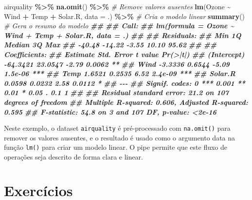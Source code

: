 \documentclass[
]{book}
\newenvironment{Shaded}{\begin{snugshade}}{\end{snugshade}}
\newcommand{\AttributeTok}[1]{\textcolor[rgb]{0.13,0.29,0.53}{#1}}
\newcommand{\CommentTok}[1]{\textcolor[rgb]{0.56,0.35,0.01}{\textit{#1}}}
\newcommand{\DocumentationTok}[1]{\textcolor[rgb]{0.56,0.35,0.01}{\textbf{\textit{#1}}}}
\newcommand{\FunctionTok}[1]{\textcolor[rgb]{0.13,0.29,0.53}{\textbf{#1}}}
\newcommand{\NormalTok}[1]{#1}
\newcommand{\SpecialCharTok}[1]{\textcolor[rgb]{0.81,0.36,0.00}{\textbf{#1}}}
\begin{document}
\begin{Shaded}
\begin{Highlighting}[]
\NormalTok{airquality }\SpecialCharTok{\%\textgreater{}\%}
  \FunctionTok{na.omit}\NormalTok{() }\SpecialCharTok{\%\textgreater{}\%} \CommentTok{\# Remove valores ausentes}
  \FunctionTok{lm}\NormalTok{(Ozone }\SpecialCharTok{\textasciitilde{}}\NormalTok{ Wind }\SpecialCharTok{+}\NormalTok{ Temp }\SpecialCharTok{+}\NormalTok{ Solar.R, }\AttributeTok{data =}\NormalTok{ .) }\SpecialCharTok{\%\textgreater{}\%} \CommentTok{\# Cria o modelo linear}
  \FunctionTok{summary}\NormalTok{() }\CommentTok{\# Gera o resumo do modelo}
\DocumentationTok{\#\# }
\DocumentationTok{\#\# Call:}
\DocumentationTok{\#\# lm(formula = Ozone \textasciitilde{} Wind + Temp + Solar.R, data = .)}
\DocumentationTok{\#\# }
\DocumentationTok{\#\# Residuals:}
\DocumentationTok{\#\#    Min     1Q Median     3Q    Max }
\DocumentationTok{\#\# {-}40.48 {-}14.22  {-}3.55  10.10  95.62 }
\DocumentationTok{\#\# }
\DocumentationTok{\#\# Coefficients:}
\DocumentationTok{\#\#             Estimate Std. Error t value Pr(\textgreater{}|t|)    }
\DocumentationTok{\#\# (Intercept) {-}64.3421    23.0547   {-}2.79   0.0062 ** }
\DocumentationTok{\#\# Wind         {-}3.3336     0.6544   {-}5.09  1.5e{-}06 ***}
\DocumentationTok{\#\# Temp          1.6521     0.2535    6.52  2.4e{-}09 ***}
\DocumentationTok{\#\# Solar.R       0.0598     0.0232    2.58   0.0112 *  }
\DocumentationTok{\#\# {-}{-}{-}}
\DocumentationTok{\#\# Signif. codes:  0 \textquotesingle{}***\textquotesingle{} 0.001 \textquotesingle{}**\textquotesingle{} 0.01 \textquotesingle{}*\textquotesingle{} 0.05 \textquotesingle{}.\textquotesingle{} 0.1 \textquotesingle{} \textquotesingle{} 1}
\DocumentationTok{\#\# }
\DocumentationTok{\#\# Residual standard error: 21.2 on 107 degrees of freedom}
\DocumentationTok{\#\# Multiple R{-}squared:  0.606,  Adjusted R{-}squared:  0.595 }
\DocumentationTok{\#\# F{-}statistic: 54.8 on 3 and 107 DF,  p{-}value: \textless{}2e{-}16}
\end{Highlighting}
\end{Shaded}

Neste exemplo, o dataset \texttt{airquality} é pré-processado com \texttt{na.omit()}
para remover os valores ausentes, e o resultado é usado como o argumento
data na função \texttt{lm()} para criar um modelo linear. O pipe permite que
este fluxo de operações seja descrito de forma clara e linear.

\section{Exercícios}\label{exercuxedcios-10}
\end{document}
